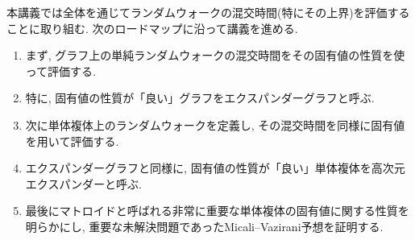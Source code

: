 本講義では全体を通じてランダムウォークの混交時間(特にその上界)を評価することに取り組む.
次のロードマップに沿って講義を進める.
\begin{enumerate}
\item まず, グラフ上の単純ランダムウォークの混交時間をその固有値の性質を使って評価する.
\item 特に, 固有値の性質が「良い」グラフをエクスパンダーグラフと呼ぶ.
\item 次に単体複体上のランダムウォークを定義し, その混交時間を同様に固有値を用いて評価する.
\item エクスパンダーグラフと同様に, 固有値の性質が「良い」単体複体を高次元エクスパンダーと呼ぶ.
\item 最後にマトロイドと呼ばれる非常に重要な単体複体の固有値に関する性質を明らかにし, 重要な未解決問題であったMicali--Vazirani予想を証明する.
\end{enumerate}
